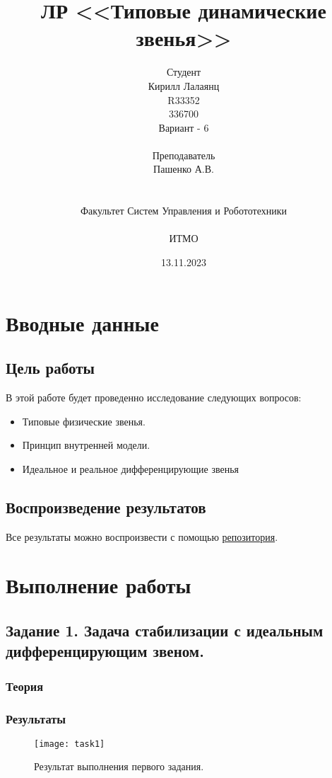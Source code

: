 \documentclass[16pt]{article}
\title{ЛР \textnumero 5 <<Типовые динамические звенья>>}
\author{
Студент \\
Кирилл Лалаянц\\
R33352\\
336700\\
Вариант - 6\\
\\
Преподаватель\\
Пашенко А.В. \\
\\
\\
Факультет Систем Управления и Робототехники\\
\\
ИТМО\\
}
\date{13.11.2023}
\begin{document}
\maketitle
\newpage
\tableofcontents
\thispagestyle{empty}

\newpage
\setcounter{page}{1}
\section{Вводные данные}
\subsection{Цель работы}
В этой работе будет проведенно исследование следующих вопросов:
\begin{itemize}
    \item Типовые физические звенья.
    \item Принцип внутренней модели.
    \item Идеальное и реальное дифференцирующие звенья
\end{itemize} 

\subsection{Воспроизведение результатов}
Все результаты можно воспроизвести с помощью \href{https://github.com/lalayants/control-theory-itmo-2023}{репозитория}.

\newpage
\section{Выполнение работы}
\label{sec:headings}


\subsection{Задание 1. Задача стабилизации с идеальным дифференцирующим звеном.}

\subsubsection{Теория}


\subsubsection{Результаты}

\begin{figure}[h!]
    \centering
    \texttt{[image: task1]}
    \caption{Результат выполнения первого задания.}
    \label{fig:fig1}
\end{figure}
\end{document}
